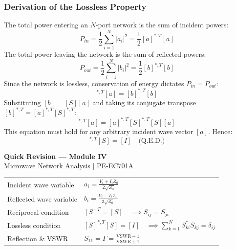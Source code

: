 \documentclass[12pt,a4paper]{article}
\renewcommand{\arraystretch}{1.45}
\begin{document}
\subsubsection{Derivation of the Lossless Property}
The total power entering an $N$-port network is the sum of incident powers:
\begin{equation*}
  P_{in} = \frac{1}{2} \sum_{i=1}^N |a_i|^2 = \frac{1}{2} [a]^{*, T} [a]
\end{equation*}
The total power leaving the network is the sum of reflected powers:
\begin{equation*}
  P_{out} = \frac{1}{2} \sum_{i=1}^N |b_i|^2 = \frac{1}{2} [b]^{*, T} [b]
\end{equation*}
Since the network is lossless, conservation of energy dictates $P_{in} = P_{out}$:
\begin{equation*}
  [a]^{*, T} [a] = [b]^{*, T} [b]
\end{equation*}
Substituting $[b] = [S][a]$ and taking its conjugate transpose $[b]^{*, T} = [a]^{*, T} [S]^{*, T}$:
\begin{equation*}
  [a]^{*, T} [a] = [a]^{*, T} [S]^{*, T} [S] [a]
\end{equation*}
This equation must hold for any arbitrary incident wave vector $[a]$. Hence:
\begin{equation}
  [S]^{*, T} [S] = [I] \quad \text{(Q.E.D.)}
\end{equation}

\newpage
\begin{center}
  {\large\bfseries\color{myred} Quick Revision --- Module IV}\\[3pt]
  {\small\color{mydark} Microwave Network Analysis $|$ PE-EC701A}
\end{center}
\noindent{\color{myred}\rule{\linewidth}{1.2pt}}
\vspace{4pt}

\begin{tcolorbox}[formulabox, title={\textbf{Key Formulas at a Glance}}]
\renewcommand{\arraystretch}{1.3}
\begin{tabularx}{\linewidth}{B{4.5cm} X}Incident wave variable  & $a_i = \frac{V_i + I_i Z_0}{2\sqrt{Z_0}}$ \\[4pt]
Reflected wave variable  & $b_i = \frac{V_i - I_i Z_0}{2\sqrt{Z_0}}$ \\[4pt]
Reciprocal condition    & $[S]^T = [S] \quad \implies S_{ij} = S_{ji}$ \\[4pt]
Lossless condition      & $[S]^{*, T} [S] = [I] \quad \implies \sum_{k=1}^N S_{ki}^* S_{kj} = \delta_{ij}$ \\[4pt]
Reflection \& VSWR      & $S_{11} = \Gamma = \frac{\text{VSWR}-1}{\text{VSWR}+1}$
\end{tabularx}
\end{tcolorbox}
\end{document}
